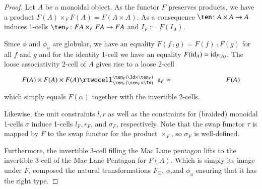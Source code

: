  \begin{proof}
Let $A$ be a monoidal object. As the functor $F$ preserves products, we have a product $F(A) \times_{F} F(A) = F(A \times A)$. As a consequence $\ten\maps
  A\times A\to A$ induces 1-cells $\ten_{F} \maps
 FA\times_{F} F A\to FA$ and $I_{F}:= F(I_A)$. 
 
Since $\phi$ and $\phi_u$ are globular, we have an equality $F(f \comp g) = F(f) \comp F(g)$ for all $f$ and $g$ and for the identity 1-cell we have an equality $F(\mathrm{id}_A) = \mathrm{id}_{F(A)}$. The loose associativity 2-cell of $A$ gives rise to a loose 2-cell
  \[\vcenter{\xymatrix@C=6pc{F(A)\times F(A)\times F(A) \rtwocell^{\ten_{F}
        (\Id\times\ten_{F})}_{\ten_{F}(\ten_{F}\times\Id)}{\hspace{.2cm}\fa_{F}\eqv} &F(A) }}\]
  which simply equals $F(\alpha)$ together with the invertible 2-cells.
  
  Likewise, the unit constraints $l, r$ as well as the constraints for (braided) monoidal 1-cells $\sigma$ induce 1-cells $l_{F}, r_{F}$, and $\sigma_{F}$, respectively. Note that the swap functor $\tau$ is mapped by $F$ to the swap functor for the product $\times_{F}$, so $\sigma_{F}$ is well-defined.
  
 Furthermore, the invertible 3-cell filling the Mac Lane pentagon lifts to the invertible 3-cell of the Mac Lane Pentagon for $F(A)$. Which is simply its image under $F$, composed the natural transformations $F_{\odot}$, $\phi$,and $\phi_u$ ensuring that it has the right type.
  

\end{proof}
